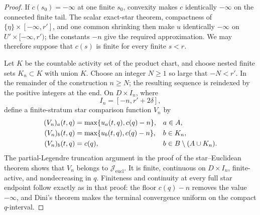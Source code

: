 \begin{proof}
If $c(s_0)=-\infty$ at one finite $s_0$, convexity makes $c$ identically
$-\infty$ on the connected finite tail.  The scalar exact-star theorem,
compactness of $\{\eta\}\times[-\infty,r']$, and one common shrinking then
make $u$ identically $-\infty$ on $U'\times[-\infty,r')$; the constants
$-n$ give the required approximation.  We may therefore suppose that
$c(s)$ is finite for every finite $s<r$.

Let $K$ be the countable activity set of the product chart, and choose
nested finite sets $K_n\subset K$ with union $K$.  Choose an integer
$N\geq1$ so large that $-N<r'$.  In the remainder of the construction
$n\geq N$; the resulting sequence is reindexed by the positive integers
at the end.  On
$D\times I_n$, where
\[
                         I_n=[-n,r'+2\delta],
\]
define a finite-stratum star comparison function $V_n$ by
\begin{align}
 (V_n)_a(t,q)&=\max\{u_a(t,q),c(q)-n\},
                                      &&a\in A,\notag\\
 (V_n)_b(t,q)&=\max\{u_b(t,q),c(q)-n\},
                                      &&b\in K_n,\label{eq:p071-star-infinite-collar-star-truncation}\\
 (V_n)_b(t,q)&=c(q),
                                      &&b\in B\setminus(A\cup K_n).
\notag
\end{align}
The partial-Legendre truncation argument in the proof of the
star--Euclidean theorem shows that $V_n$ belongs to
$\mathcal J_{\mathrm{eucl}}$.  It is finite, continuous on
$D\times I_n$, finite-active, and nondecreasing in $q$.  Finiteness and
continuity at every full star endpoint follow exactly as in that proof:
the floor $c(q)-n$ removes the value $-\infty$, and Dini's theorem makes
the terminal convergence uniform on the compact $q$-interval.


\end{proof}
